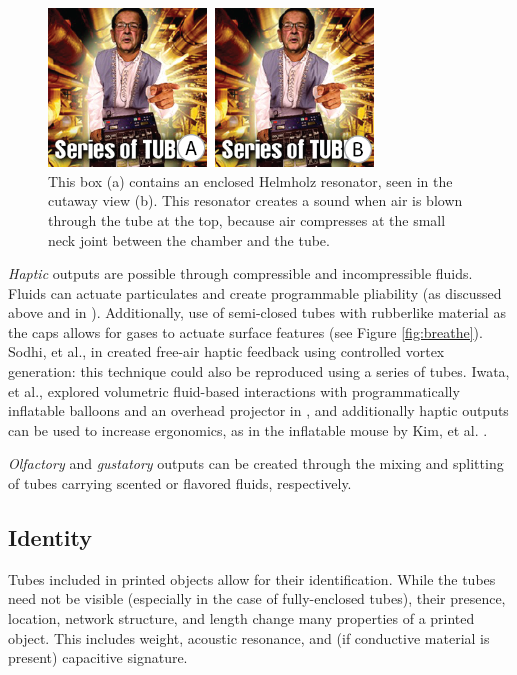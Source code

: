 \begin{figure}[h]
\centering
    \includegraphics[width=3.4in]{figures/helmholz.png}
\caption{This box (a) contains an enclosed Helmholz resonator, seen in the cutaway view (b).  This resonator creates a sound when air is blown through the tube at the top, because air compresses at the small neck joint between the chamber and the tube.  }
\label{fig:ocarina}
\end{figure}

\emph{Haptic} outputs are possible through compressible and incompressible fluids.  Fluids can actuate particulates and create programmable pliability (as discussed above and in \cite{Follmer-jamming}).  Additionally, use of semi-closed tubes with rubberlike material as the caps allows for gases to actuate surface features (see Figure \ref{fig:breathe}).  Sodhi, et al., in \cite{Sodhi-aireal} created free-air haptic feedback using controlled vortex generation: this technique could also be reproduced using a series of tubes.  Iwata, et al., explored volumetric fluid-based interactions with programmatically inflatable balloons and an overhead projector in \cite{Iwata-volflex}, and additionally haptic outputs can be used to increase ergonomics, as in the inflatable mouse by Kim, et al. \cite{Kim-inflatablemouse}.

\emph{Olfactory} and \emph{gustatory} outputs can be created through the mixing and splitting of tubes carrying scented or flavored fluids, respectively.

\subsection{Identity}

Tubes included in printed objects allow for their identification.  While the tubes need not be visible (especially in the case of fully-enclosed tubes), their presence, location, network structure, and length change many properties of a printed object.  This includes weight, acoustic resonance, and (if conductive material is present) capacitive signature.

